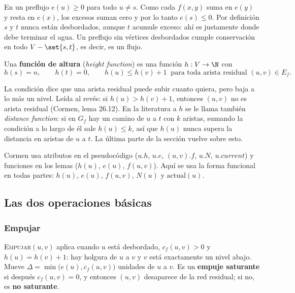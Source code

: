 \documentclass[11pt,letterpaper]{article}
\begin{document}
En un preflujo $e(u) \ge 0$ para todo $u \neq s$. Como cada $f(x, y)$
suma en $e(y)$ y resta en $e(x)$, los excesos suman cero y por lo tanto
$e(s) \le 0$. Por definición $s$ y $t$ nunca están desbordados, aunque
$t$ acumule exceso: ahí es justamente donde debe terminar el agua. Un
preflujo sin vértices desbordados cumple conservación en todo
$V - \set{s, t}$, es decir, es un flujo.

\begin{definicion}
  \label{def:altura-push}
  Una \textbf{función de altura} (\textit{height function}) es una
  función $h : V \to \N$ con
  \[
    h(s) = n , \qquad h(t) = 0 , \qquad
    h(u) \le h(v) + 1 \ \text{ para toda arista residual }
    (u, v) \in E_f .
  \]
\end{definicion}

La condición dice que una arista residual puede subir cuanto quiera,
pero baja a lo más un nivel. Leída al revés: si $h(u) > h(v) + 1$,
entonces $(u, v)$ no es arista residual (Cormen, lema 26.12). En la
literatura a $h$ se le llama también \textit{distance function}: si en
$G_f$ hay un camino de $u$ a $t$ con $k$ aristas, sumando la condición
a lo largo de él sale $h(u) \le k$, así que $h(u)$ nunca supera la
distancia en aristas de $u$ a $t$. La última parte de la sección
vuelve sobre esto.

\begin{observacion}
  Cormen usa atributos en el pseudocódigo ($u.h$, $u.e$, $(u, v).f$,
  $u.N$, $u.\mathit{current}$) y funciones en los lemas ($h(u)$,
  $e(u)$, $f(u, v)$). Aquí se usa la forma funcional en todas partes:
  $h(u)$, $e(u)$, $f(u, v)$, $N(u)$ y $\text{actual}(u)$.
\end{observacion}


\subsection*{Las dos operaciones básicas}

\subsubsection*{Empujar}

\textsc{Empujar}$(u, v)$ aplica cuando $u$ está desbordado,
$c_f(u, v) > 0$ y $h(u) = h(v) + 1$: hay holgura de $u$ a $v$ y $v$
está exactamente un nivel abajo. Mueve
$\Delta = \min\bigl(e(u), c_f(u, v)\bigr)$ unidades de $u$ a $v$. Es
un \textbf{empuje saturante} si después $c_f(u, v) = 0$, y entonces
$(u, v)$ desaparece de la red residual; si no, es \textbf{no
saturante}.
\end{document}
